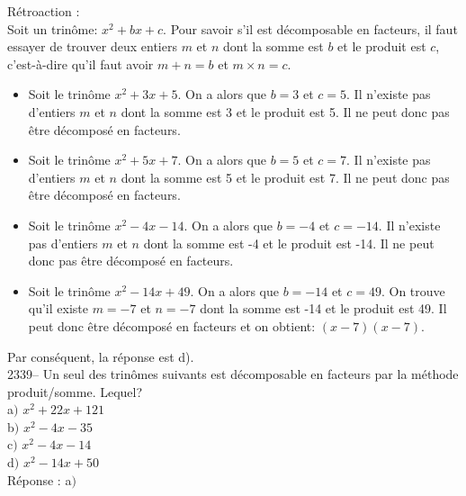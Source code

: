 \documentclass[letterpaper, 12pt]{article}
\begin{document}
R\'etroaction :\\
Soit un trin\^ome: $x^{2}+bx+c$. Pour savoir s'il est d\'ecomposable en facteurs, il faut essayer de trouver deux entiers $m$ et $n$ dont la somme est $b$ et le produit est $c$, c'est-\`a-dire qu'il faut avoir $m+n=b$ et $m\times n=c$.\\
\begin{itemize}
\item Soit le trin\^ome $x^{2}+3x+5$. On a alors que $b=3$ et $c=5$. Il n'existe pas d'entiers $m$ et $n$ dont la somme est 3 et le produit est 5. Il ne peut donc pas \^etre d\'ecompos\'e en facteurs.\\
\item Soit le trin\^ome $x^{2}+5x+7$. On a alors que $b=5$ et $c=7$. Il n'existe pas d'entiers $m$ et $n$ dont la somme est 5 et le produit est 7. Il ne peut donc pas \^etre d\'ecompos\'e en facteurs.\\
\item Soit le trin\^ome $x^{2}-4x-14$. On a alors que $b=-4$ et $c=-14$. Il n'existe pas d'entiers $m$ et $n$ dont la somme est -4 et le produit est -14. Il ne peut donc pas \^etre d\'ecompos\'e en facteurs.\\
\item Soit le trin\^ome $x^{2}-14x+49$. On a alors que $b=-14$ et $c=49$. On trouve qu'il existe $m=-7$ et $n=-7$ dont la somme est -14 et le produit est 49. Il peut donc \^etre d\'ecompos\'e en facteurs et on obtient: $(x-7)(x-7)$.\\
\end{itemize}
Par cons\'equent, la r\'eponse est d).\\

2339--  Un seul des trin\^omes suivants est d\'ecomposable en facteurs par la m\'ethode produit/somme. Lequel?\\

a$)$ $x^{2}+22x+121$\\
b$)$ $x^{2}-4x-35$\\
c$)$ $x^{2}-4x-14$\\
d$)$ $x^{2}-14x+50$\\

R\'eponse : a$)$\\
\end{document}
